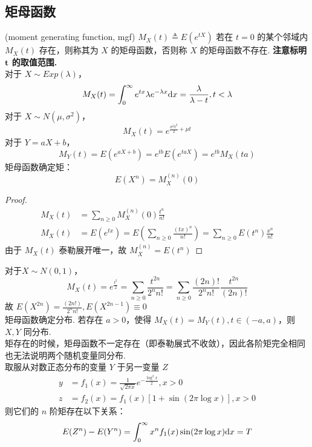 \documentclass[./main.tex]{subfiles}
\begin{document}
\subsection{矩母函数}
(moment generating function, mgf) $M_X(t)\triangleq E(e^{tX})$ 若在 $t=0$ 的某个邻域内 $M_X(t)$ 存在，则称其为 $X$ 的矩母函数，否则称 $X$ 的矩母函数不存在. \textbf{注意标明 $\bm{t}$ 的取值范围. }\\
对于 $X\sim Exp(\lambda)$，
\begin{equation}
    M_X(t)=\int_0^{\infty}e^{tx}\lambda e^{-\lambda x}\text{d}x=\frac{\lambda}{\lambda -t},t<\lambda
\end{equation}
对于 $X\sim N(\mu,\sigma^2)$，
\begin{equation}
    M_X(t)=e^{\frac{\sigma^2t^2}{2}+\mu t}
\end{equation}
对于 $Y=aX+b$，
\begin{equation}
    M_Y(t)=E(e^{aX+b})=e^{tb}E(e^{taX})=e^{tb}M_X(ta)
\end{equation}
矩母函数确定矩：\begin{equation}E(X^n)=M_X^{(n)}(0)\end{equation}
\begin{proof}
    \begin{align*}
        M_X(t)&=\sum_{n\ge 0}M_X^{(n)}(0)\frac{t^n}{n!}\\
        M_X(t)&=E(e^{tx})=E\left(\sum_{n\ge 0}\frac{(tx)^n}{n!}\right)=\sum_{n\ge 0}E(t^n)\frac{x^n}{n!}
    \end{align*}
    由于 $M_X(t)$ 泰勒展开唯一，故 $M_X^{(n)}=E(t^n)$
\end{proof}
对于$X\sim N(0,1)$，
$$M_X(t)=e^{\frac{t^2}{2}}=\sum_{n\ge 0}\frac{t^{2n}}{2^nn!}=\sum_{n\ge 0}\frac{(2n)!}{2^nn!}\frac{t^{2n}}{(2n)!}$$
故 $E(X^{2n})=\frac{(2n!)}{2^nn!},E(X^{2n-1})\equiv 0$\\
矩母函数确定分布. 若存在 $a>0$，使得 $M_X(t)=M_Y(t),t\in(-a,a)$，则 $X,Y$ 同分布. \\
矩存在的时候，矩母函数不一定存在（即泰勒展式不收敛），因此各阶矩完全相同也无法说明两个随机变量同分布. \\
取服从对数正态分布的变量 $Y$ 于另一变量 $Z$
\begin{align*}
    y&=f_1(x)=\frac{1}{\sqrt{2\pi x}}e^{-\frac{\log^2x}{2}},x>0\\
    z&=f_2(x)=f_1(x)[1+\sin(2\pi\log x)],x>0
\end{align*}
则它们的 $n$ 阶矩存在以下关系：
$$E(Z^n)-E(Y^n)=\int_0^{\infty}x^nf_1(x)\sin(2\pi\log x)\text{d}x=T$$
\end{document}
